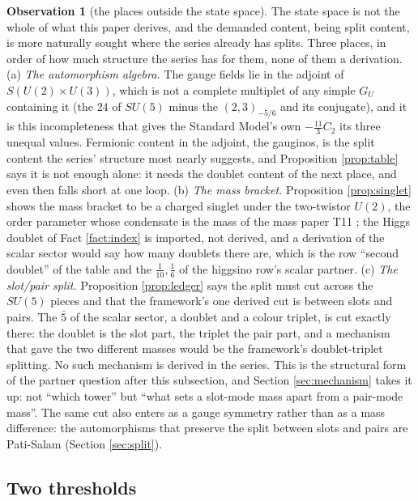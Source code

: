 \documentclass[11pt]{article}
\theoremstyle{definition}
\newtheorem{observation}[theorem]{Observation}
\begin{document}
\begin{observation}[the places outside the state space]\label{obs:seats}
The state space is not the whole of what this paper derives, and the demanded content, being split content, is more naturally sought where the series already has splits. Three places, in order of how much structure the series has for them, none of them a derivation. (a) \emph{The automorphism algebra.} The gauge fields lie in the adjoint of $S(U(2) \times U(3))$, which is not a complete multiplet of any simple $G_{U}$ containing it (the $24$ of $SU(5)$ minus the $(2,3)_{-5/6}$ and its conjugate), and it is this incompleteness that gives the Standard Model's own $-\tfrac{11}{3}C_{2}$ its three unequal values. Fermionic content in the adjoint, the gauginos, is the split content the series' structure most nearly suggests, and Proposition \ref{prop:table} says it is not enough alone: it needs the doublet content of the next place, and even then falls short at one loop. (b) \emph{The mass bracket.} Proposition \ref{prop:singlet} shows the mass bracket to be a charged singlet under the two-twistor $U(2)$, the order parameter whose condensate is the mass of the mass paper T11 \cite{ButlerT11}; the Higgs doublet of Fact \ref{fact:index} is imported, not derived, and a derivation of the scalar sector would say how many doublets there are, which is the row ``second doublet'' of the table and the $\tfrac{1}{10}, \tfrac16$ of the higgsino row's scalar partner. (c) \emph{The slot/pair split.} Proposition \ref{prop:ledger} says the split must cut across the $SU(5)$ pieces and that the framework's one derived cut is between slots and pairs. The $\bar{5}$ of the scalar sector, a doublet and a colour triplet, is cut exactly there: the doublet is the slot part, the triplet the pair part, and a mechanism that gave the two different masses would be the framework's doublet-triplet splitting. No such mechanism is derived in the series. This is the structural form of the partner question after this subsection, and Section \ref{sec:mechanism} takes it up: not ``which tower'' but ``what sets a slot-mode mass apart from a pair-mode mass''. The same cut also enters as a gauge symmetry rather than as a mass difference: the automorphisms that preserve the split between slots and pairs are Pati-Salam (Section \ref{sec:split}).
\end{observation}


\subsection{Two thresholds}\label{subsec:twothresholds}
\end{document}
